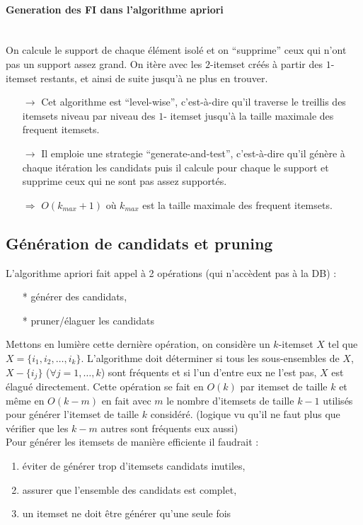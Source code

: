 \documentclass{article}
\begin{document}
\begin{sffamily}
\paragraph{Generation des FI dans l'algorithme apriori}$ $ \\ On calcule le support de chaque élément isolé et on ``supprime'' ceux qui 
n'ont pas un support assez grand. On itère avec les $2$-itemset créés à partir des $1$-itemset restants, et ainsi de suite jusqu'à ne plus
en trouver.
\begin{itemize}
\item[$\rightarrow$] Cet algorithme est ``level-wise'', c'est-à-dire qu'il traverse le treillis des itemsets niveau par niveau des $1$-
itemset jusqu'à la taille maximale des frequent itemsets.
\item[$\rightarrow$] Il emploie une strategie ``generate-and-test'', c'est-à-dire qu'il génère à chaque itération les candidats puis il 
calcule pour chaque le support et supprime ceux qui ne sont pas assez supportés.
\item[$\Rightarrow$] $O(k_{max} + 1)$ où $k_{max}$ est la taille maximale des frequent itemsets.
\end{itemize}

\subsection{Génération de candidats et pruning}

L'algorithme apriori fait appel à 2 opérations (qui n'accèdent pas à la DB) :
\begin{itemize}
\item[*] générer des candidats,
\item[*] pruner/élaguer les candidats
\end{itemize}

Mettons en lumière cette dernière opération, on considère un $k$-itemset $X$ tel que $X = \{i_1,i_2,\ldots,i_k\}$. L'algorithme doit 
déterminer si tous les sous-ensembles de $X$, $X-\{i_j\}$ ($\forall j = 1,\ldots,k$) sont fréquents et si l'un d'entre eux ne l'est pas, 
$X$ est élagué directement. Cette opération se fait en $O(k)$ par itemset de taille $k$ et même en $O(k-m)$ en fait avec $m$ le nombre
d'itemsets de taille $k-1$ utilisés pour générer l'itemset de taille $k$ considéré. (logique vu qu'il ne faut plus que vérifier que les $k-
m$ autres sont fréquents eux aussi) \\
Pour générer les itemsets de manière efficiente il faudrait :
\begin{enumerate}
\item éviter de générer trop d'itemsets candidats inutiles,
\item assurer que l'ensemble des candidats est complet,
\item un itemset ne doit être générer qu'une seule fois
\end{enumerate}


\end{sffamily}
\end{document}
